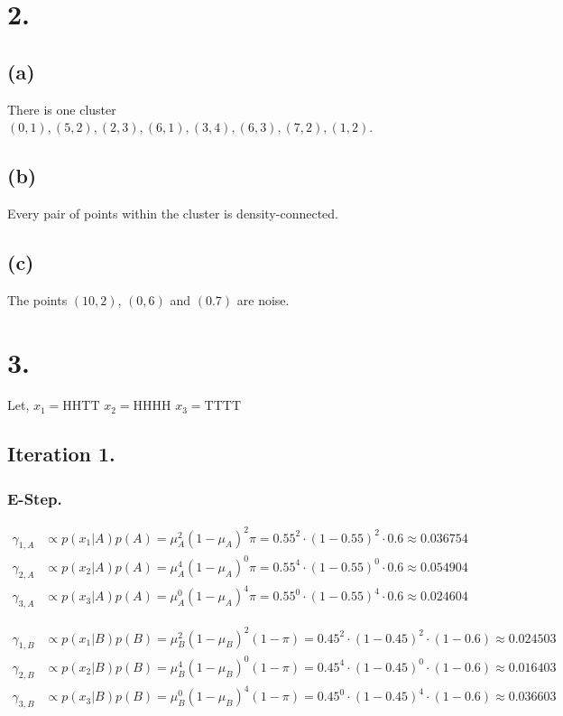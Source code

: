 \documentclass[12pt]{article}
\begin{document}
	\section*{2.}
	\subsection*{(a)}
	There is one cluster ${(0,1),(5,2),(2,3),(6,1),(3,4),(6,3),(7,2),(1,2)}$.

	\subsection*{(b)}
	Every pair of points within the cluster is density-connected.

	\subsection*{(c)}
	The points $(10,2)$, $(0,6)$ and $(0.7)$ are noise.

	\section*{3.}
	Let, $x_1 = \textrm{HHTT}$ $x_2 = \textrm{HHHH}$ $x_3 = \textrm{TTTT}$
	
	\subsection*{Iteration 1.}

	\subsubsection*{E-Step.}

	\begin{align*}
		\gamma_{1,A} &\propto p\left(x_1 \vert A\right) p\left(A\right)
		= \mu_A^2 \left(1-\mu_A \right)^2 \pi
		= 0.55^2 \cdot \left(1-0.55\right)^2 \cdot 0.6
		\approx 0.036754 \\
		\gamma_{2,A} &\propto p\left(x_2 \vert A\right) p\left(A\right)
		= \mu_A^4 \left(1-\mu_A\right)^0 \pi
		= 0.55^4 \cdot \left(1-0.55\right)^0 \cdot 0.6
		\approx 0.054904 \\
		\gamma_{3,A} &\propto p\left(x_3 \vert A\right) p\left(A\right)
		= \mu_A^0 \left(1-\mu_A\right)^4 \pi
		= 0.55^0 \cdot \left(1-0.55\right)^4 \cdot 0.6
		\approx 0.024604
	\end{align*}

	\begin{align*}
		\gamma_{1,B} &\propto p\left(x_1 \vert B\right) p\left(B\right)
		= \mu_B^2 \left(1-\mu_B \right)^2 \left(1-\pi\right)
		= 0.45^2 \cdot \left(1-0.45\right)^2 \cdot \left(1-0.6\right)
		\approx 0.024503 \\
		\gamma_{2,B} &\propto p\left(x_2 \vert B\right) p\left(B\right)
		= \mu_B^4 \left(1-\mu_B\right)^0 \left(1-\pi\right)
		= 0.45^4 \cdot \left(1-0.45\right)^0 \cdot \left(1-0.6\right)
		\approx 0.016403 \\
		\gamma_{3,B} &\propto p\left(x_3 \vert B\right) p\left(B\right)
		= \mu_B^0 \left(1-\mu_B\right)^4 \left(1-\pi\right)
		= 0.45^0 \cdot \left(1-0.45\right)^4 \cdot \left(1-0.6\right)
		\approx 0.036603
	\end{align*}
\end{document}
